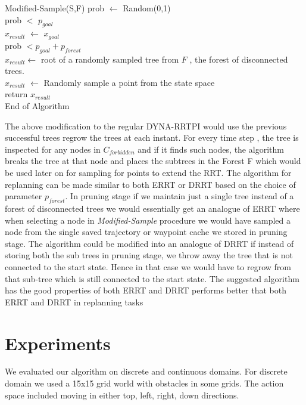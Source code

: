 \documentclass[MTech]{iitmdiss}
\begin{document}
\begin{algorithm}{Modified-Sample(S,F)}{
\label{algo: Modified-Sample}
}
prob $\leftarrow$ Random(0,1)\\
\qif prob $<$ $p_{goal}$\\
\qthen $x_{result}$ $\leftarrow$ $x_{goal}$\\
\qelse \qif prob $< p_{goal} + p_{forest}$\\
\qthen $x_{result} \leftarrow$ root of a randomly sampled tree from $F$ , the forest of disconnected trees.\\
\qelse $x_{result}$ $\leftarrow$ Randomly sample a point from the state space \qfi\qfi\\
return $x_{result}$\\
End of Algorithm
\end{algorithm}

The above modification to the regular DYNA-RRTPI would use the previous successful trees regrow the trees at each instant. For every time step , the tree is inspected for any nodes in $C_{forbidden}$ and if it finds such nodes, the algorithm breaks the tree at that node and places the subtrees in the Forest F which would be used later on for sampling for points to extend the RRT. The algorithm for replanning can be made similar to both ERRT \cite{errt} or DRRT \cite{drrt} based on the choice of parameter $p_{forest}$. In pruning stage if we maintain just a single tree instead of a forest of disconnected trees we would essentially get an analogue of ERRT where when selecting a node in \textit{Modified-Sample} procedure we would have sampled a node from the single saved trajectory or waypoint cache we stored in pruning stage. The algorithm could be modified into an analogue of DRRT if instead of storing both the sub trees in pruning stage, we throw away the tree that is not connected to the start state. Hence in that case we would have to regrow from that sub-tree which is still connected to the start state. The suggested algorithm has the good properties of both ERRT and DRRT performs better that both ERRT and DRRT in replanning tasks \cite{mprrt}

\section{Experiments}

We evaluated our algorithm on discrete and continuous domains. For discrete domain we used a 15x15 grid world with obstacles in some grids. The action space included moving in either top, left, right, down directions.
\end{document}
